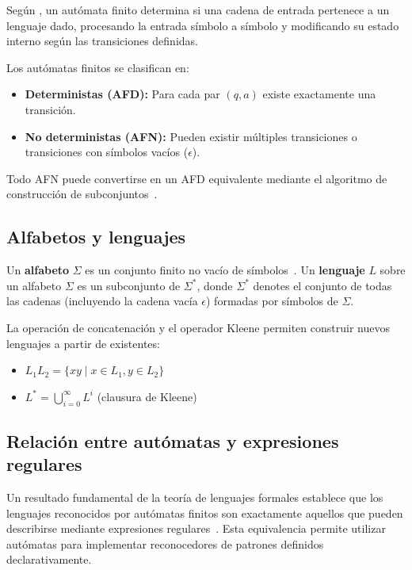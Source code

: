 \documentclass[12pt,letterpaper]{article}
\begin{document}
Según \textcite{sipser2012introduction}, un autómata finito determina si una cadena de entrada pertenece a un lenguaje dado, procesando la entrada símbolo a símbolo y modificando su estado interno según las transiciones definidas.

Los autómatas finitos se clasifican en:

\begin{itemize}
    \item \textbf{Deterministas (AFD):} Para cada par $(q, a)$ existe exactamente una transición.
    \item \textbf{No deterministas (AFN):} Pueden existir múltiples transiciones o transiciones con símbolos vacíos ($\epsilon$).
\end{itemize}

Todo AFN puede convertirse en un AFD equivalente mediante el algoritmo de construcción de subconjuntos~\cite{hopcroft2008introduction}.

\subsection{Alfabetos y lenguajes}
Un \textbf{alfabeto} $\Sigma$ es un conjunto finito no vacío de símbolos~\cite{linz2012introduction}. Un \textbf{lenguaje} $L$ sobre un alfabeto $\Sigma$ es un subconjunto de $\Sigma^*$, donde $\Sigma^*$ denotes el conjunto de todas las cadenas (incluyendo la cadena vacía $\epsilon$) formadas por símbolos de $\Sigma$.

La operación de concatenación y el operador Kleene permiten construir nuevos lenguajes a partir de existentes:

\begin{itemize}
    \item $L_1 L_2 = \{xy \mid x \in L_1, y \in L_2\}$
    \item $L^* = \bigcup_{i=0}^{\infty} L^i$ (clausura de Kleene)
\end{itemize}

\subsection{Relación entre autómatas y expresiones regulares}
Un resultado fundamental de la teoría de lenguajes formales establece que los lenguajes reconocidos por autómatas finitos son exactamente aquellos que pueden describirse mediante expresiones regulares~\cite{hopcroft2008introduction}. Esta equivalencia permite utilizar autómatas para implementar reconocedores de patrones definidos declarativamente.
\end{document}
